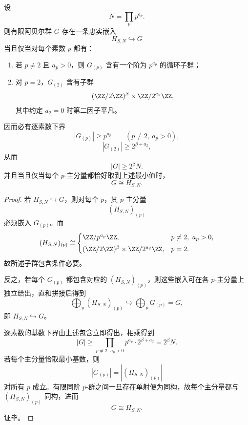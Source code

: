 \begin{theorem}[忠实有限受体的逐素数最小支撑律]\label{thm:conclusion-mixed-hiddenstate-prime-by-prime-minimal-support}
设
\[
N=\prod_p p^{a_p}.
\]
则有限阿贝尔群 \(G\) 存在一条忠实嵌入
\[
H_{S,N}\hookrightarrow G
\]
当且仅当对每个素数 \(p\) 都有：
\begin{enumerate}
  \item 若 \(p\neq 2\) 且 \(a_p>0\)，则 \(G_{(p)}\) 含有一个阶为 \(p^{a_p}\) 的循环子群；
  \item 对 \(p=2\)，\(G_{(2)}\) 含有子群
  \[
  (\ZZ/2\ZZ)^\beta\times \ZZ/2^{a_2}\ZZ,
  \]
  其中约定 \(a_2=0\) 时第二因子平凡。
\end{enumerate}
因而必有逐素数下界
\[
|G_{(p)}|\ge p^{a_p}\qquad (p\neq 2,\ a_p>0),
\]
\[
|G_{(2)}|\ge 2^{\beta+a_2},
\]
从而
\[
|G|\ge 2^\beta N.
\]
并且当且仅当每个 \(p\)-主分量都恰好取到上述最小值时，
\[
G\cong H_{S,N}.
\]
\end{theorem}
\begin{proof}
若 \(H_{S,N}\hookrightarrow G\)，则对每个 \(p\)，其 \(p\)-主分量
\[
(H_{S,N})_{(p)}
\]
必须嵌入 \(G_{(p)}\)。而
\[
(H_{S,N})_{(p)}\cong
\begin{cases}
\ZZ/p^{a_p}\ZZ,& p\neq 2,\ a_p>0,\\[1mm]
(\ZZ/2\ZZ)^\beta\times \ZZ/2^{a_2}\ZZ,& p=2.
\end{cases}
\]
故所述子群包含条件必要。

反之，若每个 \(G_{(p)}\) 都包含对应的 \((H_{S,N})_{(p)}\)，则这些嵌入可在各 \(p\)-主分量上独立给出，直和拼接后得到
\[
\bigoplus_p(H_{S,N})_{(p)}\hookrightarrow \bigoplus_p G_{(p)}=G,
\]
即 \(H_{S,N}\hookrightarrow G\)。

逐素数的基数下界由上述包含立即得出，相乘得到
\[
|G|\ge \prod_{p\neq 2,\ a_p>0}p^{a_p}\cdot 2^{\beta+a_2}=2^\beta N.
\]
若每个主分量恰取最小基数，则
\[
|G_{(p)}|=|(H_{S,N})_{(p)}|
\]
对所有 \(p\) 成立。有限同阶 \(p\)-群之间一旦存在单射便为同构，故每个主分量都与 \((H_{S,N})_{(p)}\) 同构，进而
\[
G\cong H_{S,N}.
\]
证毕。
\end{proof}

\endinput
